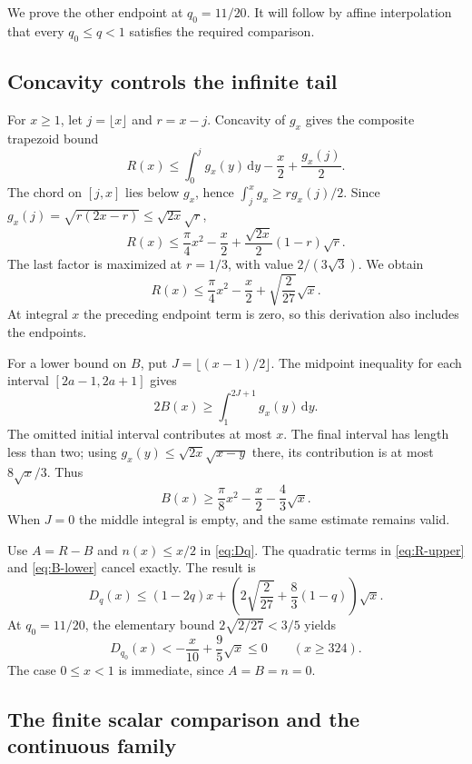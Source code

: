 \documentclass[11pt,reqno]{amsart}
\numberwithin{equation}{section}
\newcommand{\dd}{\,\mathrm d}
\begin{document}
We prove the other endpoint at $q_0=11/20$. It will follow by
affine interpolation that every $q_0\le q<1$ satisfies the
required comparison.

\subsection*{Concavity controls the infinite tail}

For $x\ge1$, let $j=\lfloor x\rfloor$ and $r=x-j$. Concavity
of $g_x$ gives the composite trapezoid bound
\[
 R(x)\le\int_0^j g_x(y)\dd y-\frac x2+\frac{g_x(j)}2.
\]
The chord on $[j,x]$ lies below $g_x$, hence
$\int_j^x g_x\ge r g_x(j)/2$. Since
$g_x(j)=\sqrt{r(2x-r)}\le\sqrt{2x}\sqrt r$,
\[
 R(x)\le\frac\pi4x^2-\frac x2
       +\frac{\sqrt{2x}}2(1-r)\sqrt r.
\]
The last factor is maximized at $r=1/3$, with value
$2/(3\sqrt3)$. We obtain
\begin{equation}\label{eq:R-upper}
 R(x)\le\frac\pi4x^2-\frac x2
              +\sqrt{\frac2{27}}\sqrt x.
\end{equation}
At integral $x$ the preceding endpoint term is zero, so this
derivation also includes the endpoints.

For a lower bound on $B$, put $J=\lfloor(x-1)/2\rfloor$.
The midpoint inequality for each interval $[2a-1,2a+1]$ gives
\[
 2B(x)\ge\int_1^{2J+1}g_x(y)\dd y.
\]
The omitted initial interval contributes at most $x$.
The final interval has length less than two; using
$g_x(y)\le\sqrt{2x}\sqrt{x-y}$ there, its contribution is
at most $8\sqrt x/3$. Thus
\begin{equation}\label{eq:B-lower}
 B(x)\ge\frac\pi8x^2-\frac x2-\frac43\sqrt x.
\end{equation}
When $J=0$ the middle integral is empty, and the same estimate
remains valid.

Use $A=R-B$ and $n(x)\le x/2$ in \eqref{eq:Dq}.
The quadratic terms in \eqref{eq:R-upper} and
\eqref{eq:B-lower} cancel exactly. The result is
\begin{equation}\label{eq:D-tail}
 D_q(x)\le(1-2q)x+
 \left(2\sqrt{\frac2{27}}+\frac83(1-q)\right)\sqrt x.
\end{equation}
At $q_0=11/20$, the elementary bound
$2\sqrt{2/27}<3/5$ yields
\begin{equation}\label{eq:thin-tail}
 D_{q_0}(x)<-\frac{x}{10}+\frac95\sqrt x\le0
 \qquad(x\ge324).
\end{equation}
The case $0\le x<1$ is immediate, since $A=B=n=0$.

\subsection*{The finite scalar comparison and the continuous family}
\end{document}
